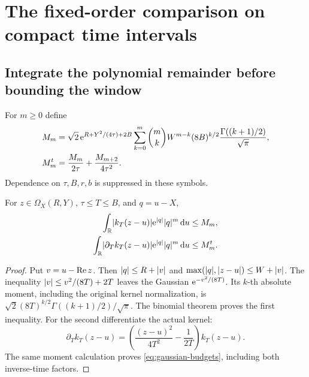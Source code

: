\section{The fixed-order comparison on compact time intervals}
\label{sec:comparison}
\subsection{Integrate the polynomial remainder before bounding the window}
For \(m\ge0\) define
\begin{subequations}\label{eq:gaussian-budgets}
\begin{align}
 M_m&=\sqrt2\,\mathrm e^{R+Y^2/(4\tau)+2B}
   \sum_{k=0}^m\binom{m}{k}W^{m-k}(8B)^{k/2}
                        \frac{\Gamma((k+1)/2)}{\sqrt\pi},\\
 M_m^t&=\frac{M_m}{2\tau}+\frac{M_{m+2}}{4\tau^2}.
\end{align}
\end{subequations}
Dependence on \(\tau,B,r,b\) is suppressed in these symbols.
\begin{lemma}\label{lem:moments}
For \(z\in\Omega_X(R,Y)\), \(\tau\le T\le B\), and \(q=u-X\),
\begin{subequations}\label{eq:moment-bounds}
\begin{align}
 \int_\mathbb R\lvert k_T(z-u)\rvert\mathrm e^{\lvert q\rvert}\lvert q\rvert^m\,\mathrm d u&\le M_m,\\
 \int_\mathbb R\lvert \partial_Tk_T(z-u)\rvert\mathrm e^{\lvert q\rvert}\lvert q\rvert^m\,\mathrm d u&\le M_m^t.
\end{align}
\end{subequations}
\end{lemma}
\begin{proof}
Put \(v=u-\operatorname{Re} z\).
Then \(\lvert q\rvert\le R+\lvert v\rvert\) and
\(\max(\lvert q\rvert,\lvert z-u\rvert)\le W+\lvert v\rvert\).
The inequality \(\lvert v\rvert\le v^2/(8T)+2T\) leaves the Gaussian
\(\mathrm e^{-v^2/(8T)}\).
Its \(k\)-th absolute moment, including the original kernel
normalization, is
\(\sqrt2(8T)^{k/2}\Gamma((k+1)/2)/\sqrt\pi\).
The binomial theorem proves the first inequality.
For the second differentiate the actual kernel:
\begin{equation}
 \partial_Tk_T(z-u)
 =\left(\frac{(z-u)^2}{4T^2}-\frac1{2T}\right)k_T(z-u).
 \label{eq:time-kernel}
\end{equation}
The same moment calculation proves \eqref{eq:gaussian-budgets},
including both inverse-time factors.
\end{proof}

